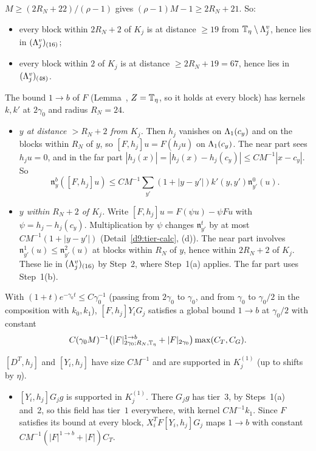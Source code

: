 \begin{detail}
\begin{step}
\end{step}
\begin{step}[Inclusions]
$M\ge(2R_N+22)/(\rho-1)$ gives $(\rho-1)M-1\ge2R_N+21$. So:
\begin{itemize}
\item every block within $2R_N+2$ of $K_j$ is at distance $\ge19$ from $\mathbb T_\eta\setminus\Lambda^v_j$, hence lies in $(\Lambda^v_j)_{(16)}$;
\item every block within $2$ of $K_j$ is at distance $\ge2R_N+19=67$, hence lies in $(\Lambda^v_j)_{(48)}$.
\end{itemize}
\end{step}
\begin{step}
The bound $1\to b$ of $F$ (Lemma~, $Z=\mathbb T_\eta$, so it holds at every block) has kernels $k,k'$ at $2\gamma_0$ and radius $R_N=24$.
\begin{itemize}
\item \emph{$y$ at distance $>R_N+2$ from $K_j$.} Then $h_j$ vanishes on $\Lambda_1(c_y)$ and on the blocks within $R_N$ of $y$, so $[F,h_j]u=F(h_ju)$ on $\Lambda_1(c_y)$. The near part sees $h_ju=0$, and in the far part $|h_j(x)|=|h_j(x)-h_j(c_y)|\le CM^{-1}|x-c_y|$. So
\[
\mathfrak n^b_y([F,h_j]u)\le CM^{-1}\sum_{y'}(1+|y-y'|)k'(y,y')\mathfrak n^0_{y'}(u) .
\]
\item \emph{$y$ within $R_N+2$ of $K_j$.} Write $[F,h_j]u=F(\psi u)-\psi Fu$ with $\psi=h_j-h_j(c_y)$. Multiplication by $\psi$ changes $\mathfrak n^t_{y'}$ by at most $CM^{-1}(1+|y-y'|)$ (Detail~\ref{d9:tier-calc}, (d)). The near part involves $\mathfrak n^1_{y'}(u)\le\mathfrak n^2_{y'}(u)$ at blocks within $R_N$ of $y$, hence within $2R_N+2$ of $K_j$. These lie in $(\Lambda^v_j)_{(16)}$ by Step~2, where Step~1(a) applies. The far part uses Step~1(b).
\end{itemize}
With $(1+t)e^{-\gamma_0t}\le C\gamma_0^{-1}$ (passing from $2\gamma_0$ to $\gamma_0$, and from $\gamma_0$ to $\gamma_0/2$ in the composition with $k_0,k_1$), $[F,h_j]Y_iG_j$ satisfies a global bound $1\to b$ at $\gamma_0/2$ with constant
\[
C(\gamma_0M)^{-1}\big(|F|^{1\to b}_{2\gamma_0;R_N,\mathbb T_\eta}+|F|_{2\gamma_0}\big)\max(C_T,C_G) .
\]
\end{step}
\begin{step}
$[D^T,h_j]$ and $[Y_i,h_j]$ have size $CM^{-1}$ and are supported in $K_j^{(1)}$ (up to shifts by $\eta$).
\begin{itemize}
\item $[Y_i,h_j]G_jg$ is supported in $K_j^{(1)}$. There $G_jg$ has tier~$3$, by Steps~1(a) and~2, so this field has tier~$1$ everywhere, with kernel $CM^{-1}k_1$. Since $F$ satisfies its bound at every block, $X_i^TF[Y_i,h_j]G_j$ maps $1\to b$ with constant $CM^{-1}(|F|^{1\to b}+|F|)C_T$.

\end{itemize}
\end{step}
\end{detail}
